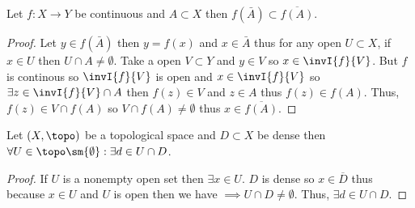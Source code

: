 \documentclass[12pt]{extarticle}
\begin{document}
\begin{lemma} \label{contclosure}
Let $f : X \rightarrow Y$ be continuous and $A \subset X$ then $f(\bar{A}) \subset \overline{f(A)}$.
\end{lemma}
\begin{proof}
Let $y \in f(\bar{A})$ then $y = f(x)$ and $x \in \bar{A}$ thus for any open $U \subset X$, if $x \in U$ then $U \cap A \neq \emptyset$. Take a open $V \subset Y$ and $y \in V$ so $x \in \invI{f}{V}$. But $f$ is continous so $\invI{f}{V}$ is open and $x \in \invI{f}{V}$ so $\exists z \in \invI{f}{V} \cap A$ then $f(z) \in V$ and $z \in A$ thus $f(z) \in f(A)$. Thus, $f(z) \in V \cap f(A)$ so $V \cap f(A) \neq \emptyset$ thus $x \in \overline{f(A)}$.  
\end{proof}

\begin{lemma} \label{denseintersect}
Let $(X, \topo)$ be a topological space and $D \subset X$ be dense then $\forall U \in \topo \sm \{ \emptyset\} : \exists d \in U \cap D$.
\end{lemma}
\begin{proof}
If $U$ is a nonempty open set then $\exists x \in U$. $D$ is dense so $x \in \overline{D}$ thus because $x \in U$ and $U$ is open then we have $\implies U \cap D \neq \emptyset$. Thus, $\exists d \in U \cap D$.    
\end{proof}
\end{document}
